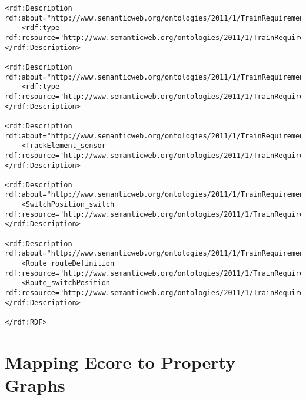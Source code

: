 \begin{lstlisting}[caption=A graph based on the railway system metamodel stored in RDF format]
<rdf:Description rdf:about="http://www.semanticweb.org/ontologies/2011/1/TrainRequirementOntology.owl#3">
	<rdf:type rdf:resource="http://www.semanticweb.org/ontologies/2011/1/TrainRequirementOntology.owl#Switch"/>
</rdf:Description>

<rdf:Description rdf:about="http://www.semanticweb.org/ontologies/2011/1/TrainRequirementOntology.owl#4">
	<rdf:type rdf:resource="http://www.semanticweb.org/ontologies/2011/1/TrainRequirementOntology.owl#SwitchPosition"/>
</rdf:Description>

<rdf:Description rdf:about="http://www.semanticweb.org/ontologies/2011/1/TrainRequirementOntology.owl#3">
	<TrackElement_sensor rdf:resource="http://www.semanticweb.org/ontologies/2011/1/TrainRequirementOntology.owl#1"/>
</rdf:Description>

<rdf:Description rdf:about="http://www.semanticweb.org/ontologies/2011/1/TrainRequirementOntology.owl#4">
	<SwitchPosition_switch rdf:resource="http://www.semanticweb.org/ontologies/2011/1/TrainRequirementOntology.owl#3"/>
</rdf:Description>

<rdf:Description rdf:about="http://www.semanticweb.org/ontologies/2011/1/TrainRequirementOntology.owl#2">
	<Route_routeDefinition rdf:resource="http://www.semanticweb.org/ontologies/2011/1/TrainRequirementOntology.owl#1"/>
	<Route_switchPosition rdf:resource="http://www.semanticweb.org/ontologies/2011/1/TrainRequirementOntology.owl#4"/>
</rdf:Description>

</rdf:RDF>
\end{lstlisting}

\section{Mapping Ecore to Property Graphs}
\label{trainbenchmark-mapping}

